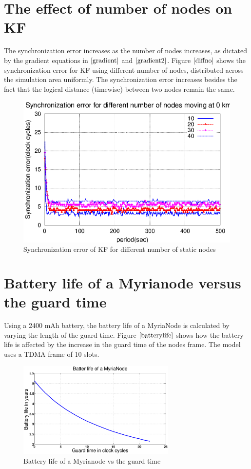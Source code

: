 \documentclass[a4paper,10pt]{report}
\begin{document}
\section{\textbf{The effect of number of nodes on KF}}
The synchronization error increases as the number of nodes increases, as dictated by the gradient equations in $\cite{gradient}$ and $\cite{gradient2}$. Figure $\ref{diffno}$ shows the synchronization error for KF using different number of nodes, distributed across the simulation area uniformly. The synchronization error increases besides the fact that the logical distance (timewise) between two nodes remain the same.
\begin{figure}[!h]
\centering
\includegraphics[width= 0.7 \textwidth]{diffno}
\caption{Synchronization error of KF for different number of static nodes}
\label{diffno}
\end{figure}
\section{\textbf{Battery life of a Myrianode versus the guard time}}
Using a 2400 mAh battery, the battery life of a MyriaNode is
calculated by varying the length of the guard time. Figure
$\ref{batterylife}$ shows how the battery life is affected by the
increase in the guard time of the nodes frame. The model uses a TDMA
frame of 10 slots.
\begin{figure}[!h]
\centering
\includegraphics[width = 0.7\textwidth]{guardsave}
\caption{Battery life of a Myrianode vs the guard time}
\label{batterylife}
\end{figure}
\end{document}
